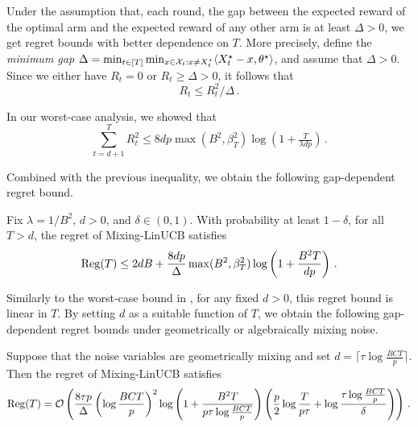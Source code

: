 Under the assumption that, each round, the gap between the expected reward of the optimal arm and the expected reward of any other arm is at least $\Delta > 0$, we get regret bounds with better dependence on $T$. More precisely, define the \emph{minimum gap} $\Delta = \min_{t \in [T]}\min_{x \in \mathcal{X}_t: x \neq X_t^{\star}}\langle X_t^{\star} - x,\theta^{\star}\rangle$, and assume that $\Delta > 0$. Since we either have $R_t = 0$ or $R_t \geq \Delta > 0$, it follows that
\begin{equation*}
R_t \leq R_t^2/\Delta\,.
\end{equation*}

In our worst-case analysis, we showed that
\begin{equation*}
\sum_{t=d+1}^{T}R_t^2 \leq 8dp\max(B^2, \beta_T^2)\log(1 + \tfrac{T}{\lambda dp})\,.
\end{equation*}

Combined with the previous inequality, we obtain the following gap-dependent regret bound.

\begin{theorem}
Fix $\lambda = 1/B^2$, $d>0$, and $\delta\in(0,1)$. With probability at least $1 - \delta$, for all $T > d$, the regret of Mixing-LinUCB satisfies
\begin{align*}
\mathrm{Reg}(T) \leq 2dB + \frac{8dp}{\Delta}\max(B^2, \beta_{T}^2)\log\left(1 + \frac{B^2T}{dp}\right)\,.
\end{align*}
\label{thm:gap_reg}
\end{theorem}

Similarly to the worst-case bound in , for any fixed $d > 0$, this regret bound is linear in $T$. By setting $d$ as a suitable function of $T$, we obtain the following gap-dependent regret bounds under geometrically or algebraically mixing noise. 

\begin{corollary}
\label{cor2:geometric_mixing}
Suppose that the noise variables are geometrically mixing and set $d = \lceil \tau\log\tfrac{BCT}{p}\rceil$. Then the regret of Mixing-LinUCB satisfies
\begin{align*}
\mathrm{Reg}(T) = \mathcal{O}\left(\frac{8\tau p}{\Delta}\left(\log\frac{BCT}{p}\right)^2\log\left(1 + \frac{B^2T}{p\tau \log\frac{BCT}{p}}\right)\left(\frac{p}{2}\log\frac{T}{p\tau}+\log \frac{\tau\log \frac{BCT}{p}}{\delta}\right)\right)\,.
\end{align*}
\label{cor:gap_reg_geo}
\end{corollary}

